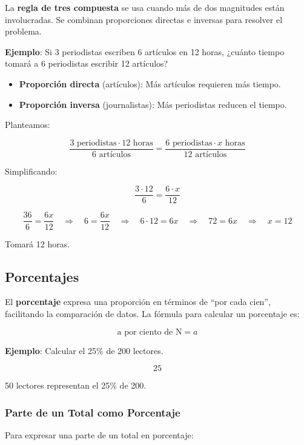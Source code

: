 \documentclass[
  stu,
  floatsintext,
  longtable,
  a4paper,
  nolmodern,
  notxfonts,
  notimes,
  12pt,
  colorlinks=true,linkcolor=blue,citecolor=blue,urlcolor=blue]{apa7}
\providecommand{\tightlist}{%
  \setlength{\itemsep}{0pt}\setlength{\parskip}{0pt}}
\begin{document}
La \textbf{regla de tres compuesta} se usa cuando más de dos magnitudes
están involucradas. Se combinan proporciones directas e inversas para
resolver el problema.

\textbf{Ejemplo}: Si 3 periodistas escriben 6 artículos en 12 horas,
¿cuánto tiempo tomará a 6 periodistas escribir 12 artículos?

\begin{itemize}
\tightlist
\item
  \textbf{Proporción directa} (artículos): Más artículos requieren más
  tiempo.
\item
  \textbf{Proporción inversa} (journalistas): Más periodistas reducen el
  tiempo.
\end{itemize}

Planteamos:

\[
\frac{3 \text{ periodistas} \cdot 12 \text{ horas}}{6 \text{ artículos}} = \frac{6 \text{ periodistas} \cdot x \text{ horas}}{12 \text{ artículos}}
\]

Simplificando:

\[
\frac{3 \cdot 12}{6} = \frac{6 \cdot x}{12}
\]

\[
\frac{36}{6} = \frac{6x}{12} \quad \Rightarrow \quad 6 = \frac{6x}{12} \quad \Rightarrow \quad 6 \cdot 12 = 6x \quad \Rightarrow \quad 72 = 6x \quad \Rightarrow \quad x = 12
\]

Tomará 12 horas.

\subsection{Porcentajes}\label{porcentajes}

El \textbf{porcentaje} expresa una proporción en términos de ``por cada
cien'', facilitando la comparación de datos. La fórmula para calcular un
porcentaje es:

\[
\text{a por ciento de N} = a%
\]

\textbf{Ejemplo}: Calcular el 25\% de 200 lectores.

\[
25%
\]

50 lectores representan el 25\% de 200.

\subsubsection{Parte de un Total como
Porcentaje}\label{parte-de-un-total-como-porcentaje}

Para expresar una parte de un total en porcentaje:
\end{document}
